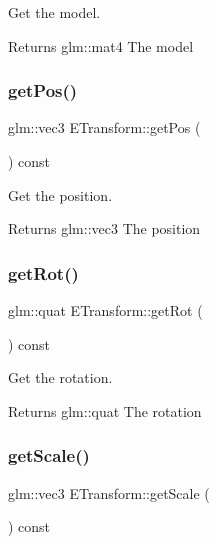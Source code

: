Get the model. 

\begin{DoxyReturn}{Returns}
glm\+::mat4 The model 
\end{DoxyReturn}
\mbox{\label{class_e_transform_a5583083e2b1ec969ef86b694e740d043}} 
\subsubsection{\texorpdfstring{get\+Pos()}{getPos()}}
{\footnotesize\ttfamily glm\+::vec3 E\+Transform\+::get\+Pos (\begin{DoxyParamCaption}{ }\end{DoxyParamCaption}) const}



Get the position. 

\begin{DoxyReturn}{Returns}
glm\+::vec3 The position 
\end{DoxyReturn}
\mbox{\label{class_e_transform_a86b9bd6c0062f35644db55095395bd95}} 
\subsubsection{\texorpdfstring{get\+Rot()}{getRot()}}
{\footnotesize\ttfamily glm\+::quat E\+Transform\+::get\+Rot (\begin{DoxyParamCaption}{ }\end{DoxyParamCaption}) const}



Get the rotation. 

\begin{DoxyReturn}{Returns}
glm\+::quat The rotation 
\end{DoxyReturn}
\mbox{\label{class_e_transform_addf4879d7d3eaad7448101aa494b3fac}} 
\subsubsection{\texorpdfstring{get\+Scale()}{getScale()}}
{\footnotesize\ttfamily glm\+::vec3 E\+Transform\+::get\+Scale (\begin{DoxyParamCaption}{ }\end{DoxyParamCaption}) const}



